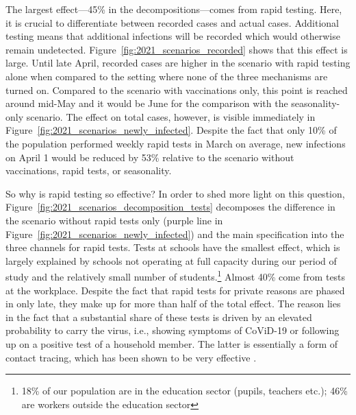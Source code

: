 The largest effect---45\% in the decompositions---comes from rapid testing. Here, it is
crucial to differentiate between recorded cases and actual cases. Additional testing
means that additional infections will be recorded which would otherwise remain
undetected. Figure~\ref{fig:2021_scenarios_recorded} shows that this effect is large.
Until late April, recorded cases are higher in the scenario with rapid testing alone
when compared to the setting where none of the three mechanisms are turned on. Compared
to the scenario with vaccinations only, this point is reached around mid-May and it
would be June for the comparison with the seasonality-only scenario. The effect on total
cases, however, is visible immediately in
Figure~\ref{fig:2021_scenarios_newly_infected}. Despite the fact that only 10\%  of the
population performed weekly rapid tests in March on average, new infections on April 1
would be reduced by 53\% relative to the scenario without vaccinations, rapid tests, or
seasonality.

So why is rapid testing so effective? In order to shed more light on this question,
Figure~\ref{fig:2021_scenarios_decomposition_tests} decomposes the difference in the
scenario without rapid tests only (purple line in
Figure~\ref{fig:2021_scenarios_newly_infected}) and the main specification into the
three channels for rapid tests. Tests at schools have the smallest effect, which is
largely explained by schools not operating at full capacity during our period of study
and the relatively small number of students.\footnote{18\% of our population are in the
education sector (pupils, teachers etc.); 46\% are workers outside the education sector}
Almost 40\% come from tests at the workplace. Despite the fact that rapid tests for
private reasons are phased in only late, they make up for more than half of the total
effect. The reason lies in the fact that a substantial share of these tests is driven by
an elevated probability to carry the virus, i.e., showing symptoms of CoViD-19 or
following up on a positive test of a household member. The latter is essentially a form
of contact tracing, which has been shown to be very effective \citep{Contreras2021,
Kretzschmar2020,FetzerGraeber2021}.

